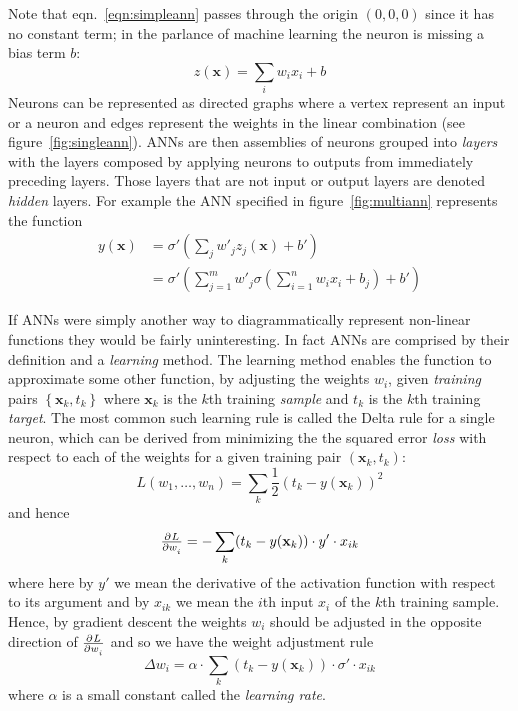 %
Note that eqn.~\eqref{eqn:simpleann} passes through the origin \((0,0,0)\) since it has no constant term; in the parlance of machine learning the neuron is missing a bias term \(b\):
\begin{equation}
    z(\mathbf{x}) = \sum_i w_i x_i + b
    \label{eqn:linearregr}
\end{equation}
%
Neurons can be represented as directed graphs where a vertex represent an input or a neuron and edges represent the weights in the linear combination (see figure~\ref{fig:singleann}).
%
ANNs are then assemblies of neurons grouped into \textit{layers} with the layers composed by applying neurons to outputs from immediately preceding layers.
%
Those layers that are not input or output layers are denoted \textit{hidden} layers.
%
For example the ANN specified in figure~\ref{fig:multiann} represents the function
\begin{equation}
    \begin{split}
        y(\mathbf{x}) &= \sigma' \left( \sum_j w'_j z_j(\mathbf{x}) + b' \right) \\
        &=  \sigma' \left( \sum_{j=1}^m w'_j \sigma\left(\sum_{i=1}^n w_i x_i + b_j\right) + b' \right)
    \end{split}
\end{equation}

If ANNs were simply another way to diagrammatically represent non-linear functions they would be fairly uninteresting.
%
In fact ANNs are comprised by their definition and a \textit{learning} method.
%
The learning method enables the function to approximate some other function, by adjusting the weights \(w_i\), given \textit{training} pairs \(\left\{ \mathbf{x}_k, t_k \right\}\) where \(\mathbf{x}_k\) is the \(k\)th training \textit{sample} and \(t_k\) is the \(k\)th training \textit{target}.
%
The most common such learning rule is called the Delta rule\cite{widrow1960adaptive} for a single neuron, which can be derived from minimizing the the squared error \textit{loss} with respect to each of the weights for a given training pair \((\mathbf{x}_k, t_k)\):
\begin{equation}
    L(w_1, \dots, w_n) = \sum_k \frac{1}{2} (t_k - y(\mathbf{x}_k))^2
\end{equation}
and hence
\begin{equation}
    \pd{L}{w_i} = - \sum_k(t_k-y(\mathbf{x}_k))\cdot y'\cdot x_{ik}
\end{equation}
where here by \(y'\) we mean the derivative of the activation function with respect to its argument and by \(x_{ik}\) we mean the \(i\)th input \(x_i\) of the \(k\)th training sample.
%
Hence, by gradient descent the weights \(w_i\) should be adjusted in the opposite direction of \(\pd{L}{w_i}\) and so we have the weight adjustment rule
\begin{equation}
    \Delta w_i = \alpha \cdot \sum_k(t_k-y(\mathbf{x}_k))\cdot \sigma'\cdot x_{ik}
    \label{eqn:batchupdate}
\end{equation}
where \(\alpha\) is a small constant called the \textit{learning rate}.

